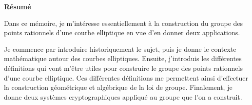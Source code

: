 \documentclass[a4paper]{report}
\begin{document}
    \tableofcontents
    \newpage
    \begin{center}
        \textbf{Résumé}

        Dans ce mémoire, je m'intéresse essentiellement à la construction du groupe des points
        rationnels d'une courbe elliptique en vue d'en donner deux applications. 

        Je commence
        par introduire historiquement le sujet, puis je donne le contexte mathématique autour des
        courbes elliptiques. Ensuite, j'introduis les différentes définitions qui vont
        m'être utiles pour construire le groupe des points rationnels d'une courbe
        elliptique. Ces différentes définitions me permettent
        ainsi d'effectuer la construction géométrique et algébrique de la loi de groupe. Finalement, je donne deux
        systèmes cryptographiques appliqué au groupe que l'on a construit.
    \end{center}
    
    
    
    
    
    
    \printbibliography[heading=bibintoc,title={Références}]
\end{document}

